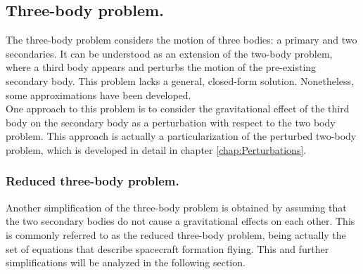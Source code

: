 		\subsection{Three-body problem.}
		\indent The three-body problem considers the motion of three bodies: a primary and two secondaries. It can be understood as an extension of the two-body problem, where a third body appears and perturbs the motion of the pre-existing secondary body. This problem lacks a general, closed-form solution. Nonetheless, some approximations have been developed. \\
		\indent One approach to this problem is to consider the gravitational effect of the third body on the secondary body as a perturbation with respect to the two body problem. This approach is actually a particularization of the perturbed two-body problem, which is developed in detail in chapter \ref{chap:Perturbations}.
			\subsubsection{Reduced three-body problem.}
			\indent Another simplification of the three-body problem is obtained by assuming that the two secondary bodies do not cause a gravitational effects on each other. This is commonly referred to as the reduced three-body problem, being actually the set of equations that describe spacecraft formation flying. This and further simplifications will be analyzed in the following section.\\
